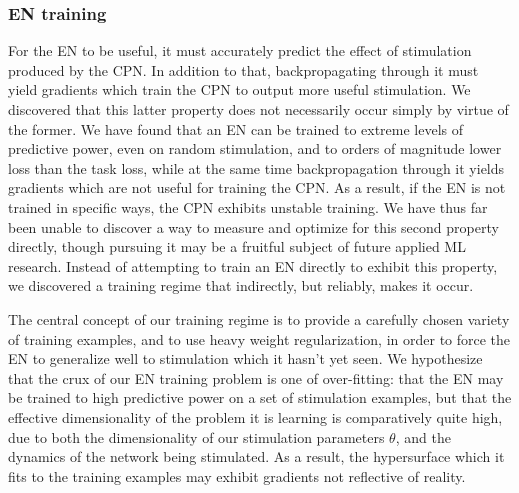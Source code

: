 \documentclass[12pt]{iopart}
\begin{document}
\subsubsection{EN training}
For the EN to be useful, it must accurately predict the effect of stimulation
produced by the CPN. In addition to that, backpropagating through it must yield
gradients which train the CPN to output more useful stimulation. We discovered that
this latter property does not necessarily occur simply by virtue of the former.
We have found that an EN can be trained to extreme levels of predictive power, even
on random stimulation, and to orders of magnitude lower loss than the task loss,
while at the same time backpropagation through it yields gradients which are not
useful for training the CPN. As a result, if the EN is not trained in specific ways,
the CPN exhibits unstable training. We have thus far been unable to discover a way
to measure and optimize for this second property directly, though pursuing it may be a
fruitful subject of future applied ML research. Instead of attempting to train an EN
directly to exhibit this property, we discovered a training regime that indirectly,
but reliably, makes it occur.

The central concept of our training regime is to provide a carefully chosen variety of
training examples, and to use heavy weight regularization, in order to force
the EN to generalize well to stimulation which it hasn't yet seen. We hypothesize that
the crux of our EN training problem is one of over-fitting: that the EN may be trained
to high predictive power on a set of stimulation examples, but that the effective
dimensionality of the problem it is learning is comparatively quite high, due to both
the dimensionality of our stimulation parameters $\theta$, and the dynamics of the
network being stimulated. As a result, the hypersurface which it fits to the training
examples may exhibit gradients not reflective of reality.
\end{document}
